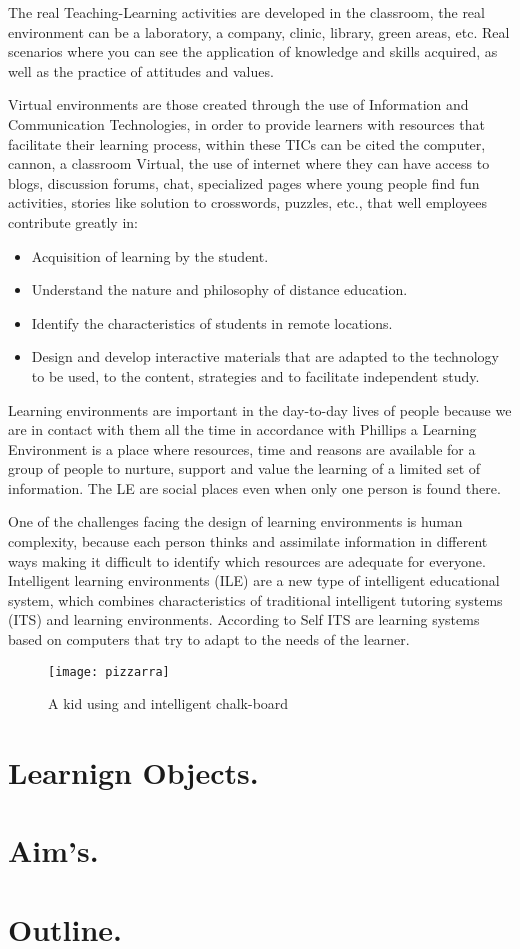 The real Teaching-Learning activities are developed in the classroom, the real environment can be a laboratory, a company, clinic, library, green areas, etc. Real scenarios where you can see the application of knowledge and skills acquired, as well as the practice of attitudes and values. 

Virtual environments are those created through the use of Information and Communication Technologies, in order to provide learners with resources that facilitate their learning process, within these TICs can be cited the computer, cannon, a classroom Virtual, the use of internet where they can have access to blogs, discussion forums, chat, specialized pages where young people find fun activities, stories like solution to crosswords, puzzles, etc., that well employees contribute greatly in:
\begin{itemize}	
\item Acquisition of learning by the student.
\item Understand the nature and philosophy of distance education.
\item Identify the characteristics of students in remote locations.
\item Design and develop interactive materials that are adapted to the technology to be used, to the content, strategies and to facilitate independent study.
\end{itemize}
Learning environments are important in the day-to-day lives of people because we are in contact with them all the time in accordance with Phillips\cite{PhilMcNaKenn2010zx} a Learning Environment is a place where resources, time and reasons are available for a group of people to nurture, support and value the learning of a limited set of information. The LE are social places even when only one person is found there. 



One of the challenges facing the design of learning environments is human complexity, because each person thinks and assimilate information in different ways making it difficult to identify which resources are adequate for everyone. Intelligent learning environments (ILE) are a new type of intelligent educational system, which combines characteristics of traditional intelligent tutoring systems (ITS) \cite{john1991} and learning environments. According to Self \cite{self1998} ITS are learning systems based on computers that try to adapt to the needs of the learner. 
\begin{figure}[ht!]  
\centering  
\texttt{[image: pizzarra]}
\quad  
\caption{A kid using and intelligent chalk-board}  
\label{name}  
\end{figure}



\section{Learnign Objects.}
\section{Aim's.}
\section{Outline.}